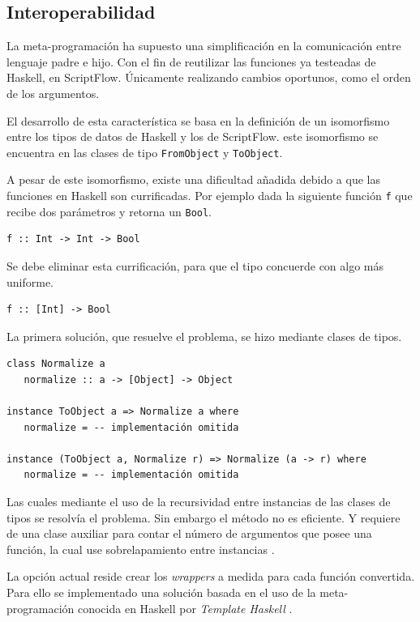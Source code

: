 \documentclass[11pt]{article}
\begin{document}
\subsection{Interoperabilidad}
\label{sec:org114a45a}

La meta-programación ha supuesto una simplificación en la comunicación entre lenguaje padre e hijo. Con el fin de reutilizar las funciones
ya testeadas de Haskell, en ScriptFlow. Únicamente realizando cambios oportunos, como el orden de los argumentos.

El desarrollo de esta característica se basa en la definición de un isomorfismo entre los tipos de datos de Haskell y los de ScriptFlow.
este isomorfismo se encuentra en las clases de tipo \texttt{FromObject} y \texttt{ToObject}.

A pesar de este isomorfismo, existe una dificultad añadida debido a que las funciones en Haskell son currificadas. Por ejemplo dada la siguiente
función \texttt{f} que recibe dos parámetros y retorna un \texttt{Bool}.

\begin{verbatim}
f :: Int -> Int -> Bool
\end{verbatim}

Se debe eliminar esta currificación, para que el tipo concuerde con algo más uniforme.

\begin{verbatim}
f :: [Int] -> Bool
\end{verbatim}

La primera solución, que resuelve el problema, se hizo mediante clases de tipos.
\begin{verbatim}
class Normalize a
   normalize :: a -> [Object] -> Object

instance ToObject a => Normalize a where
   normalize = -- implementación omitida

instance (ToObject a, Normalize r) => Normalize (a -> r) where
   normalize = -- implementación omitida
\end{verbatim}

Las cuales mediante el uso de la recursividad entre instancias de las clases de tipos se resolvía el problema. Sin embargo
el método no es eficiente. Y requiere de una clase auxiliar para contar el número de argumentos que posee una función, la cual use
sobrelapamiento entre instancias \cite{overlaping-instances}.

La opción actual reside crear los \emph{wrappers} a medida para cada función convertida. Para ello se implementado una solución
basada en el uso de la meta-programación conocida en Haskell por \emph{Template Haskell} \cite{template-haskell} .
\end{document}
